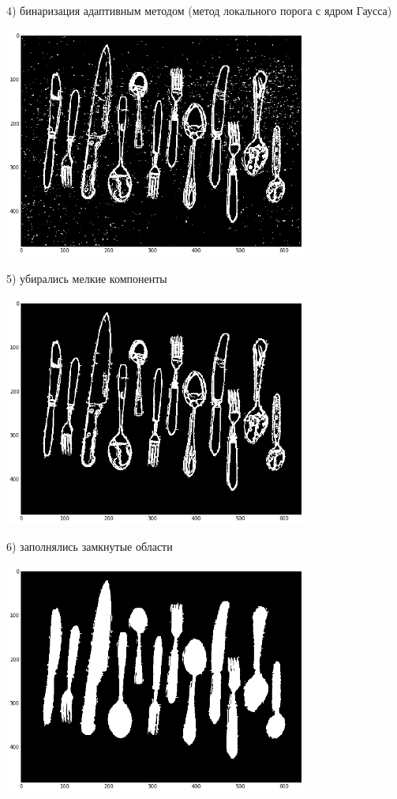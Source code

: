 \documentclass[12pt, a4paper]{article}
\begin{document}
            4) бинаризация адаптивным методом (метод локального порога с ядром Гаусса)
            \begin{center}
                \includegraphics[width=10cm]{4.png}
            \end{center}

            5) убирались мелкие компоненты
            \begin{center}
                \includegraphics[width=10cm]{5.png}
            \end{center}

            6) заполнялись замкнутые области
            \begin{center}
                \includegraphics[width=10cm]{6.png}
            \end{center}
\end{document}
